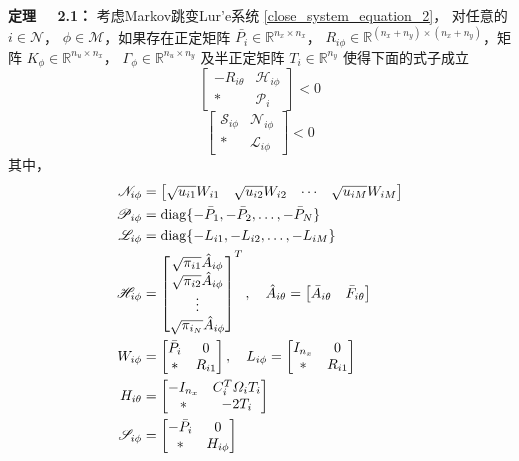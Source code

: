 	{\bf 定理 \ \ 2.1：}
	考虑Markov跳变Lur'e系统 \eqref{close_system_equation_2}， 对任意的 $i \in \mathcal{N}$， $\phi \in \mathcal{M}$，如果存在正定矩阵 $\bar{P_i} \in \mathbb{R}^{n_x\times n_x}$， $R_{i\phi } \in \mathbb{R}^{(n_x+n_y)\times(n_x+n_y)}$，矩阵 $K_{\phi} \in \mathbb{R}^{n_u\times n_x}$， $\varGamma_{\phi} \in \mathbb{R}^{n_u \times n_y}$ 及半正定矩阵 $T_{i}\in \mathbb{R}^{n_y}$ 使得下面的式子成立
	\begin{equation}\label{condition_1_1}
	\begin{bmatrix}
	-R_{i\theta}&\mathscr{H}_{i\phi}\\
	*&\mathscr{P}_{i}
	\end{bmatrix}<0
	\end{equation}
	\begin{equation}\label{condition_1_2}
	\begin{bmatrix}
	\mathscr{S}_{i\phi}&\mathscr{N}_{i\phi}\\
	*&\mathscr{L}_{i\phi}
	\end{bmatrix}<0
	\end{equation}
	其中，
	\begin{equation}\notag
	\begin{aligned}
	\mathscr{N}_{i\phi}&=\begin{bmatrix}
	\sqrt{u_{i1}}W_{i1}&\sqrt{u_{i2}}W_{i2}&\cdots&\sqrt{u_{iM}}W_{iM}
	\end{bmatrix}\\
	\mathscr{P}_{i\phi}&=\mathrm{diag} \{-\bar{P}_{1},-\bar{P}_{2},\dots,-\bar{P}_{N}  \}\\
	\mathscr{L}_{i\phi}&=\mathrm{diag} \{-L_{i1},-L_{i2},\dots,-L_{iM}  \}\\
	\mathscr{H}_{i\phi}&=\begin{bmatrix}
	\sqrt{\pi_{i1}}\hat{A}_{i\phi}\\
	\sqrt{\pi_{i2}}\hat{A}_{i\phi}\\
	\vdots\\
	\sqrt{\pi_{i_N}}\hat{A}_{i\phi}
	\end{bmatrix}^{T}, \quad
	\hat{A}_{i\theta}=\begin{bmatrix}
	\bar{A}_{i\theta}&\bar{F}_{i\theta}
	\end{bmatrix}  \\
	W_{i\phi}&=\begin{bmatrix}
	\bar{P}_{i}&0\\
	*&R_{i1}
	\end{bmatrix}, \quad
	L_{i\phi}=\begin{bmatrix}
	I_{n_x}&0\\
	*&R_{i1}
	\end{bmatrix}\\
	H_{i\theta}&=\begin{bmatrix}
	-I_{n_x}&C^{T}_{i}\varOmega_{i}T_{i} \\
	*&-2T_{i}
	\end{bmatrix}\\
	\mathscr{S}_{i\phi}&= \begin{bmatrix}
	-\bar{P}_{i}&0\\
	*&H_{i\phi}
	\end{bmatrix}\\
	\end{aligned}
	\end{equation}
